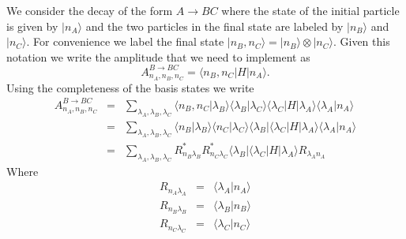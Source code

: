  We consider the decay of the form $A\rightarrow B C$ where the state
of the initial particle is given by $|n_A\rangle$ and the two particles
in the final state are labeled by $|n_B\rangle$ and $|n_C\rangle$. 
For convenience we label the final state $|n_B, n_C\rangle=|n_B\rangle
\otimes |n_C\rangle$. Given this notation we write the amplitude that
we need to implement as 
$$A^{B\rightarrow BC}_{n_A,n_B,n_C}=\langle n_B, n_C|H|n_A\rangle.$$
Using the completeness of the basis states we write
\begin{eqnarray}
A^{B\rightarrow BC}_{n_A,n_B,n_C}&=&\sum_{\lambda_A,\lambda_B,\lambda_C}\langle n_B, n_C|\lambda_B\rangle\langle\lambda_B|\lambda_C\rangle\langle\lambda_C|H|\lambda_A\rangle\langle\lambda_A|n_A\rangle\\
                                 &=&\sum_{\lambda_A,\lambda_B,\lambda_C}\langle n_B|\lambda_B\rangle \langle n_C|\lambda_C\rangle\langle\lambda_B|\langle\lambda_C|H|\lambda_A\rangle\langle\lambda_A|n_A\rangle\\
                                 &=&\sum_{\lambda_A,\lambda_B,\lambda_C}R^{*}_{n_B\lambda_B} R^{*}_{n_C\lambda_C}\langle\lambda_B|\langle\lambda_C|H|\lambda_A\rangle R_{\lambda_A n_A}
\end{eqnarray}
Where 
\begin{eqnarray}
R_{n_A\lambda_A} & = & \langle \lambda_A | n_A \rangle \\ 
R_{n_B\lambda_B} & = & \langle \lambda_B | n_B \rangle \\
R_{n_C\lambda_C} & = & \langle \lambda_C | n_C \rangle
\end{eqnarray}






